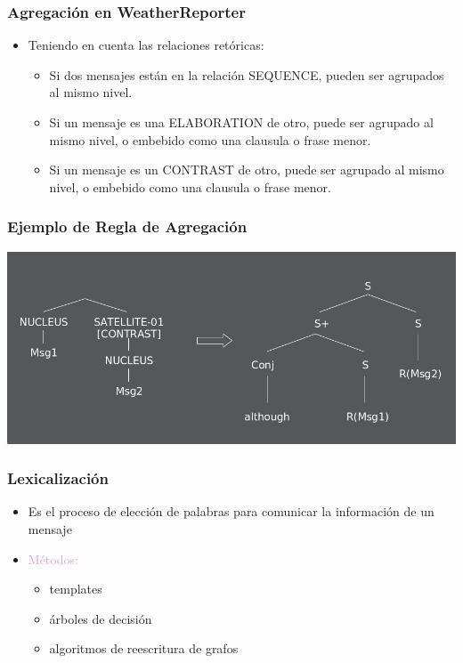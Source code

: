 \documentclass[compress,color=usenames]{beamer}
\newcommand{\mH}[1]{\textcolor{Plum}{#1}}
\begin{document}
\begin{frame}
\frametitle{Agregaci\'on en WeatherReporter}

\label{f214}
\begin{itemize}
\item Teniendo en cuenta las relaciones ret\'oricas:
\begin{itemize}
\item Si dos mensajes est\'an en la relaci\'on SEQUENCE, pueden ser agrupados al mismo nivel.
\item Si un mensaje es una ELABORATION de otro, puede ser agrupado al mismo nivel, o embebido como 
una clausula o frase menor. 
\item Si un mensaje es un CONTRAST de otro,  puede ser agrupado al mismo nivel, o embebido como 
una clausula o frase menor. 
\end{itemize}
\end{itemize}
 \end{frame}

\begin{frame}
\frametitle{Ejemplo de Regla de Agregaci\'on}

\begin{center}
\includegraphics[scale=.4]{pics/pic14.jpg}
\end{center}
 
\end{frame}

\begin{frame}
\frametitle{Lexicalizaci\'on}

\begin{itemize}
\item Es el proceso de elecci\'on de palabras para comunicar la informaci\'on de un mensaje
\item { \mH{M\'etodos:}}
\begin{itemize}
\item templates
\item \'arboles de decisi\'on
\item algoritmos de reescritura de grafos
\end{itemize}
\end{itemize}
\end{frame}
\end{document}
